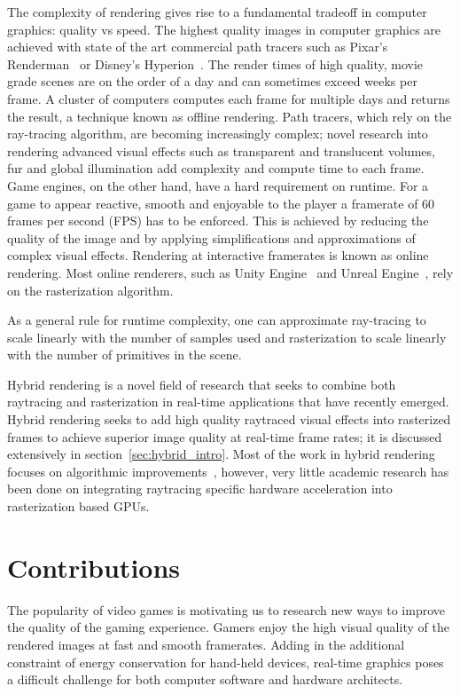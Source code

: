 The complexity of rendering gives rise to a fundamental tradeoff in computer graphics: quality vs speed. The highest quality images in computer graphics are achieved with state of the art commercial path tracers such as Pixar's Renderman~\cite{10.1145/3182162} or Disney's Hyperion~\cite{10.1145/3182159}. The render times of high quality, movie grade scenes are on the order of a day and can sometimes exceed weeks per frame. A cluster of computers computes each frame for multiple days and returns the result, a technique known as offline rendering. 
Path tracers, which rely on the ray-tracing algorithm, are becoming increasingly complex; novel research into rendering advanced visual effects such as transparent and translucent volumes, fur and global illumination add complexity and compute time to each frame.
Game engines, on the other hand, have a hard requirement on runtime. For a game to appear reactive, smooth and enjoyable to the player a framerate of 60 frames per second (FPS) has to be enforced. This is achieved by reducing the quality of the image and by applying simplifications and approximations of complex visual effects. Rendering at interactive framerates is known as online rendering. Most online renderers, such as Unity Engine~\cite{unitygameengine} and Unreal Engine~\cite{10.5555/3099885}, rely on the rasterization algorithm. 

As a general rule for runtime complexity, one can approximate ray-tracing to scale linearly with the number of samples used and rasterization to scale linearly with the number of primitives in the scene. 

Hybrid rendering is a novel field of research that seeks to combine both raytracing and rasterization in real-time applications that have recently emerged. Hybrid rendering seeks to add high quality raytraced visual effects into rasterized frames to achieve superior image quality at real-time frame rates; it is discussed extensively in section~\autoref{sec:hybrid_intro}. Most of the work in hybrid rendering focuses on algorithmic improvements~\cite{Barre_Brisebois2019}, however, very little academic research has been done on integrating raytracing specific hardware acceleration into rasterization based GPUs.

\section{Contributions}
\label{ch:Contributions}

The popularity of video games is motivating us to research new ways to improve the quality of the gaming experience. Gamers enjoy the high visual quality of the rendered images at fast and smooth framerates. Adding in the additional constraint of energy conservation for hand-held devices, real-time graphics poses a difficult challenge for both computer software and hardware architects.

